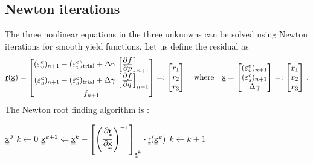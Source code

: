 \subsection{Newton iterations}
The three nonlinear equations in the three unknowns can be solved using Newton iterations
for smooth yield functions.  Let us define the residual as
\[
   \Mr(\Mx) = \begin{bmatrix} 
    (\Ve_v^e)_{n+1} -  (\Ve_v^e)_\Trial + \Delta\gamma\,\left[\Partial{f}{p}\right]_{n+1} \\
    (\Ve_s^e)_{n+1} -  (\Ve_s^e)_\Trial + \Delta\gamma\,\left[\Partial{f}{q}\right]_{n+1} \\
    f_{n+1} \end{bmatrix} =: \begin{bmatrix} r_1 \\ r_2 \\ r_3 \end{bmatrix}
   \quad \text{where} \quad
   \Mx = \begin{bmatrix} (\Ve_v^e)_{n+1} \\ (\Ve_s^e)_{n+1} \\ \Delta\gamma \end{bmatrix} 
        =: \begin{bmatrix} x_1 \\ x_2 \\ x_3 \end{bmatrix} \,.
\]
The Newton root finding algorithm is :
\begin{algorithm}
  \begin{algorithmic}
    \Require $\Mx^0$
    \State $k \leftarrow 0$
      \State $\Mx^{k+1} \Leftarrow \Mx^k - \left[\left(\Partial{\Mr}{\Mx}\right)^{-1}\right]_{\Mx^k}\cdot
              \Mr(\Mx^k)$
      \State $k \leftarrow k+1$
    \EndWhile
  \end{algorithmic}
\end{algorithm}


